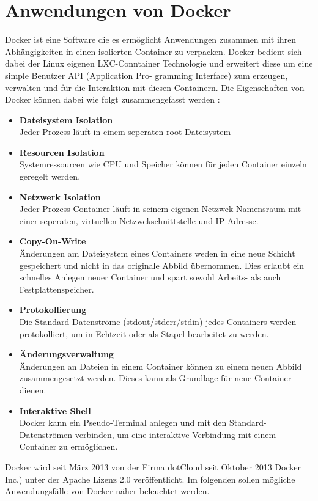 \chapter{Anwendungen von Docker}
\label{cha:anwendungen_von_docker}
Docker ist eine Software die es ermöglicht Anwendungen zusammen mit ihren Abhängigkeiten in einen isolierten Container zu verpacken. Docker bedient sich dabei der Linux eigenen LXC-Conntainer Technologie und erweitert diese um eine simple Benutzer API (Application Pro-
gramming Interface) zum erzeugen, verwalten und für die Interaktion mit diesen Containern.
Die Eigenschaften von Docker können dabei wie folgt zusammengefasst werden \cite{abel_docker:_2013}:
\begin{itemize}
 
      \item \textbf{Dateisystem Isolation} \\
Jeder Prozess läuft in einem seperaten root-Dateisystem
      \item \textbf{Resourcen Isolation} \\
Systemressourcen wie CPU und Speicher können für jeden Container einzeln geregelt werden.
      \item \textbf{Netzwerk Isolation} \\
Jeder Prozess-Container läuft in seinem eigenen Netzwek-Namensraum mit einer seperaten, 			virtuellen Netzwekschnittstelle und IP-Adresse.
      \item \textbf{Copy-On-Write} \\
Änderungen am Dateisystem eines Containers weden in eine neue Schicht gespeichert und nicht in das originale Abbild übernommen. Dies erlaubt ein schnelles Anlegen neuer Container und spart sowohl Arbeits- als auch Festplattenspeicher.
      \item \textbf{Protokollierung} \\
Die Standard-Datenströme (stdout/stderr/stdin) jedes Containers werden protokolliert, um in Echtzeit oder als Stapel bearbeitet zu werden.
	  \item \textbf{Änderungsverwaltung} \\
Änderungen an Dateien in einem Container können zu einem neuen Abbild zusammengesetzt werden. Dieses kann als Grundlage für neue Container dienen.
	  \item \textbf{Interaktive Shell} \\
Docker kann ein Pseudo-Terminal anlegen und mit den Standard-Datenströmen verbinden, um eine interaktive Verbindung mit einem Container zu ermöglichen.
\end{itemize}
Docker wird seit März 2013 von der Firma dotCloud seit Oktober 2013 Docker
Inc.) unter der Apache Lizenz 2.0 veröffentlicht.\cite{github_dotcloud/docker_2013}
Im folgenden sollen mögliche Anwendungsfälle von Docker näher beleuchtet werden.
